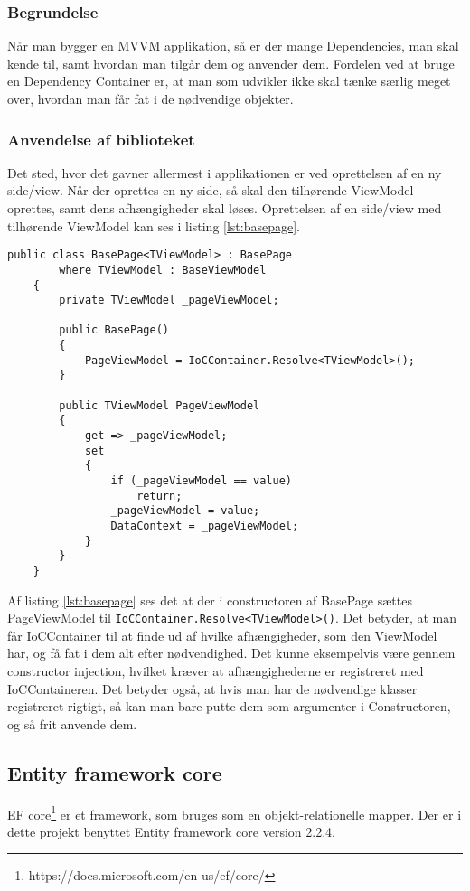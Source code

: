 \documentclass[Implementering/Implementering_main.tex]{subfiles}
\begin{document}
\subsubsection{Begrundelse}
Når man bygger en MVVM applikation, så er der mange Dependencies, man skal kende til, samt hvordan man tilgår dem og anvender dem. Fordelen ved at bruge en Dependency Container er, at man som udvikler ikke skal tænke særlig meget over, hvordan man får fat i de nødvendige objekter. 

\subsubsection{Anvendelse af biblioteket}
Det sted, hvor det gavner allermest i applikationen er ved oprettelsen af en ny side/view. Når der oprettes en ny side, så skal den tilhørende ViewModel oprettes, samt dens afhængigheder skal løses. Oprettelsen af en side/view med tilhørende ViewModel kan ses i listing \ref{lst:basepage}.

\begin{lstlisting}[caption={Oprettelse af en side med tilhørende ViewModel}, label={lst:basepage},
style=customc]
 public class BasePage<TViewModel> : BasePage
        where TViewModel : BaseViewModel
    {
        private TViewModel _pageViewModel;

        public BasePage()
        {
            PageViewModel = IoCContainer.Resolve<TViewModel>();
        }

        public TViewModel PageViewModel
        {
            get => _pageViewModel;
            set
            {
                if (_pageViewModel == value)
                    return;
                _pageViewModel = value;
                DataContext = _pageViewModel;
            }
        }
    }
\end{lstlisting}

Af listing \ref{lst:basepage} ses det at der i constructoren af BasePage sættes PageViewModel til \lstinline{IoCContainer.Resolve<TViewModel>()}. Det betyder, at man får IoCContainer til at finde ud af hvilke afhængigheder, som den ViewModel har, og få fat i dem alt efter nødvendighed. Det kunne eksempelvis være gennem constructor injection, hvilket kræver at afhængighederne er registreret med IoCContaineren. Det betyder også, at hvis man har de nødvendige klasser registreret rigtigt, så kan man bare putte dem som argumenter i Constructoren, og så frit anvende dem.



\subsection{Entity framework core}
EF core\footnote{https://docs.microsoft.com/en-us/ef/core/} er et framework, som bruges som en objekt-relationelle mapper. Der er i dette projekt benyttet Entity framework core version 2.2.4.  
\end{document}
